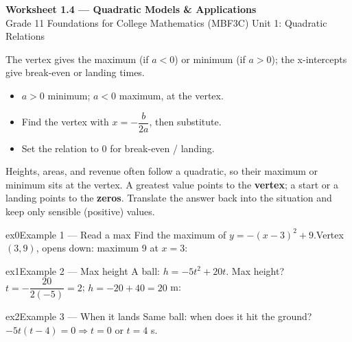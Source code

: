 \documentclass[11pt]{article}
\begin{document}
\begin{center}
{\LARGE\bfseries\color{titleblue}Worksheet 1.4 --- Quadratic Models \& Applications}\\[2pt]
{\small Grade 11 Foundations for College Mathematics (MBF3C) \textperiodcentered{} Unit 1: Quadratic Relations}
\end{center}

\begin{ideabox}
The vertex gives the maximum (if $a<0$) or minimum (if $a>0$); the x-intercepts give break-even or landing times.
\begin{itemize}[leftmargin=*,itemsep=2pt]
  \item $a>0$ minimum; $a<0$ maximum, at the vertex.
  \item Find the vertex with $x=-\dfrac{b}{2a}$, then substitute.
  \item Set the relation to $0$ for break-even / landing.
\end{itemize}
\end{ideabox}

\begin{learnbox}
Heights, areas, and revenue often follow a quadratic, so their maximum or minimum sits at the vertex.
A greatest value points to the \textbf{vertex}; a start or a landing points to the \textbf{zeros}.
Translate the answer back into the situation and keep only sensible (positive) values.
\end{learnbox}


\begin{example}{ex0}{Example 1 --- Read a max}
Find the maximum of $y=-(x-3)^2+9$.\soln Vertex $(3,9)$, opens down: maximum 9 at $x=3$:
\end{example}

\begin{example}{ex1}{Example 2 --- Max height}
A ball: $h=-5t^2+20t$. Max height?\soln $t=-\dfrac{20}{2(-5)}=2$; $h=-20+40=20$ m:
\end{example}

\begin{example}{ex2}{Example 3 --- When it lands}
Same ball: when does it hit the ground?\soln $-5t(t-4)=0\Rightarrow t=0$ or $t=4$ s.
\end{example}
\end{document}
